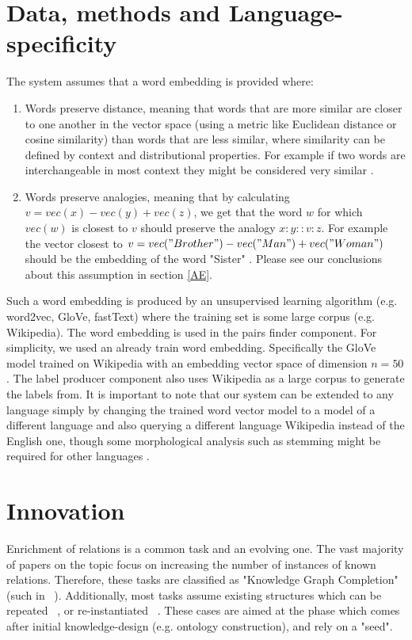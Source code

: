 \documentclass[11pt,a4paper]{article}
\begin{document}
\section{Data, methods and Language-specificity}
The system assumes that a word embedding is provided where:
\begin{enumerate}
\item Words preserve distance, meaning that words that are more similar are closer to one another in the vector space (using a metric like Euclidean distance or cosine similarity) 
than words that are less similar, where similarity can be defined by context and distributional properties. For example if two words are 
interchangeable in most context they might be considered very similar \cite{mikolov2013linguistic}.
\item Words preserve analogies, meaning that by calculating $v = vec(x) - vec(y) + vec(z)$, we get that the word $w$ for which $vec(w)$ is 
closest to $v$ should preserve the analogy $x:y::v:z$. For example the vector closest to $v = vec("Brother") - vec("Man") + vec("Woman")$ should be 
the embedding of the word "Sister" \cite{mikolov2013linguistic}. Please see our conclusions about this assumption in section \ref{AE}.
\end{enumerate}

Such a word embedding is produced by an unsupervised learning algorithm (e.g. word2vec, GloVe, fastText) where the training set is some large corpus (e.g. Wikipedia).
The word embedding is used in the pairs finder component. For simplicity, we used an already train word embedding. Specifically the GloVe model trained 
on Wikipedia with an embedding vector space of dimension $n=50$. The label producer component also uses Wikipedia as a large corpus to generate the 
labels from. It is important to note that our system can be extended to any language simply by changing the trained word vector model to a model 
of a different language and also querying a different language Wikipedia instead of the English one, though some morphological analysis such as 
stemming might be required for other languages \cite{cotterell2015morphological}.

\section{Innovation}
Enrichment of relations is a common task and an evolving one. The vast majority of papers on the topic focus on increasing the number of instances of known relations. Therefore, these tasks are classified as "Knowledge Graph Completion" (such in ~\cite{wang2014knowledge}). Additionally, most tasks assume existing structures which can be repeated ~\cite{ferragina2012fast}, or re-instantiated ~\cite{xie2016representation}. These cases are aimed at the phase which comes after initial knowledge-design (e.g. ontology construction), and rely on a "seed".
\end{document}
